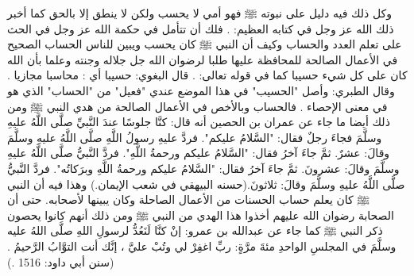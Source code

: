 وكل ذلك فيه دليل على نبوته ﷺ فهو أمي لا يحسب ولكن لا ينطق إلا بالحق كما أخبر ذلك الله عز وجل في كتابه العظيم: \quranayah*[53][3-4]{\footnotesize \surahname*[53]}. فلك أن تتأمل في حكمة الله عز وجل في الحث على تعلم العدد والحساب وكيف أن النبي ﷺ كان يحسب ويبين للناس الحساب الصحيح في الأعمال الصالحة للمحافظة عليها طلبا لرضوان الله جل جلاله وجنته وعلما بأن الله كان على كل شيء حسيبا كما في قوله تعالى: \quranayah*[4][86]{\footnotesize \surahname*[4]}. قال البغوي: حسيبا أي : محاسبا مجازيا \cite{tafsir_Baghawi}. وقال الطبري: وأصل "الحسيب" في هذا الموضع عندي "فعيل" من "الحساب" الذي هو في معنى الإحصاء \cite{tafsir_Tabari}. فالحساب وبالأخص في الأعمال الصالحة من هدي النبي ﷺ ومن ذلك أيضا ما جاء عن عمران بن الحصين أنه قال: كنَّا جلوسًا عندَ النَّبيِّ صلَّى اللَّهُ عليهِ وسلَّمَ فجاءَ رجلٌ فقال: "السَّلامُ عليكم". فردَّ عليهِ رسولُ اللَّهِ صلَّى اللَّهُ عليهِ وسلَّمَ وقالَ: عشرٌ. ثمَّ جاءَ آخرُ فقال: "السَّلامُ عليكم ورحمةُ اللَّهِ". فردَّ النَّبيُّ صلَّى اللَّهُ عليهِ وسلَّمَ وقالَ: عشرونَ. ثمَّ جاءَ آخرُ فقال: "السَّلامُ عليكم ورحمةُ اللَّهِ وبرَكاتُه". فردَّ النَّبيُّ صلَّى اللَّهُ عليهِ وسلَّمَ وقالَ: ثلاثونَ.{\footnotesize (حسنه البيهقي في شعب الإيمان.)} وهذا فيه أن النبي ﷺ كان يعلم حساب الحسنات من الأعمال الصاحلة وكان يبينها لأصحابه. حتى أن الصحابة رضوان الله عليهم أخذوا هذا الهدي من النبي ﷺ ومن ذلك أنهم  كانوا يحصون ذكر النبي ﷺ كما جاء عن عبدالله بن عمرو: إنْ كنَّا لَنَعُدُّ لرسولِ اللهِ صلَّى اللهُ عليه وسلَّمَ في المجلسِ الواحدِ مئةَ مرَّةٍ: ربِّ اغفِرْ لي وتُبْ عليَّ ، إنَّك أنت التوَّابُ الرَّحيمُ \href{https://shamela.ws/book/117359/1248#p1}{\faExternalLink} \cite{SunanAbiDawood}.{\footnotesize (سنن أبي داود: 1516 .)}

